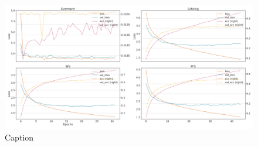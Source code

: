 \begin{figure}[!htb]
    \centering
    \includegraphics[width=\textwidth]{gfx/bpic2015_2/windowed_loss_acc_curve.png}
    \caption{Caption}
    \label{fig:my_label}
\end{figure}
\FloatBarrier

